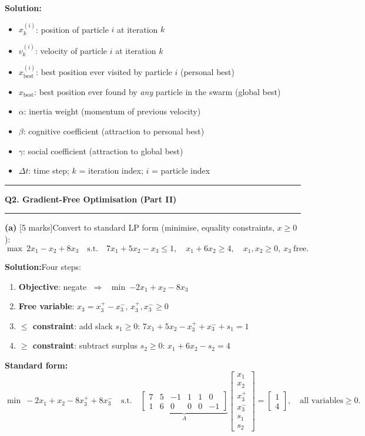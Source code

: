\documentclass[10pt,a4paper]{article}
\newcommand{\sectitle}[1]{%
  \vspace{8pt}\noindent\rule{\linewidth}{0.8pt}\par\vspace{2pt}%
  {\large\textbf{#1}}\par\vspace{2pt}\rule{\linewidth}{0.4pt}\vspace{4pt}}
\newcommand{\Sol}{\par\vspace{4pt}\noindent\textbf{Solution:}\enspace}
\begin{document}
\Sol
\begin{itemize}[noitemsep, topsep=2pt]
  \item $x^{(i)}_k$: position of particle $i$ at iteration $k$
  \item $v^{(i)}_k$: velocity of particle $i$ at iteration $k$
  \item $x^{(i)}_{\mathrm{best}}$: best position ever visited by particle $i$
        (personal best)
  \item $x_{\mathrm{best}}$: best position ever found by \emph{any} particle
        in the swarm (global best)
  \item $\alpha$: inertia weight (momentum of previous velocity)
  \item $\beta$: cognitive coefficient (attraction to personal best)
  \item $\gamma$: social coefficient (attraction to global best)
  \item $\Delta t$: time step; $k$ = iteration index; $i$ = particle index
\end{itemize}

\sectitle{Q2. Gradient-Free Optimisation (Part II)}

\noindent\textbf{(a)} [5 marks]\quad Convert to standard LP form
(minimise, equality constraints, $x\geq0$):
\[
  \max\ 2x_1 - x_2 + 8x_3 \quad\text{s.t.}\quad
  7x_1+5x_2-x_3\leq1,\quad x_1+6x_2\geq4,\quad
  x_1,x_2\geq0,\ x_3\ \text{free}.
\]

\Sol Four steps:
\begin{enumerate}[noitemsep, topsep=2pt]
  \item \textbf{Objective}: negate $\;\Rightarrow\;$ $\min\ {-2x_1+x_2-8x_3}$
  \item \textbf{Free variable}: $x_3 = x_3^+ - x_3^-$,\; $x_3^+,x_3^-\geq0$
  \item \textbf{$\leq$ constraint}: add slack $s_1\geq0$:\;
        $7x_1+5x_2-x_3^++x_3^-+s_1=1$
  \item \textbf{$\geq$ constraint}: subtract surplus $s_2\geq0$:\;
        $x_1+6x_2-s_2=4$
\end{enumerate}

\textbf{Standard form:}
\[
  \min\ -2x_1+x_2-8x_3^++8x_3^-
  \quad\text{s.t.}\quad
  \underbrace{\begin{bmatrix}7&5&-1&1&1&0\\1&6&0&0&0&-1\end{bmatrix}}_{A}
  \begin{bmatrix}x_1\\x_2\\x_3^+\\x_3^-\\s_1\\s_2\end{bmatrix}
  =\begin{bmatrix}1\\4\end{bmatrix},\quad
  \text{all variables}\geq0.
\]
\end{document}

